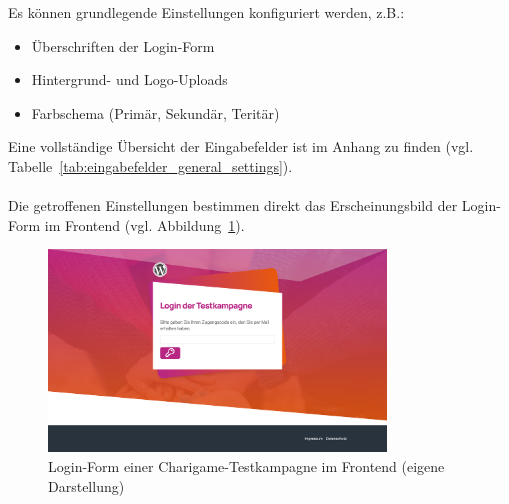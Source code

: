 Es können grundlegende Einstellungen konfiguriert werden, z.B.:
\begin{itemize}
\item Überschriften der Login-Form
\item Hintergrund- und Logo-Uploads
\item Farbschema (Primär, Sekundär, Teritär)
\end{itemize}
Eine vollständige Übersicht der Eingabefelder ist im Anhang zu finden (vgl. Tabelle~\ref{tab:eingabefelder_general_settings}).
\\\\
Die getroffenen Einstellungen bestimmen direkt das Erscheinungsbild der Login-Form im Frontend (vgl. Abbildung~\ref{fig:login-textkampagne}).

\begin{figure}[H]
    \centering
    \includegraphics[width=0.8\textwidth]{images/legacy_login_testkampagne}
    \caption{Login-Form einer Charigame-Testkampagne im Frontend (eigene Darstellung)}
    \label{fig:login-textkampagne}
\end{figure}

